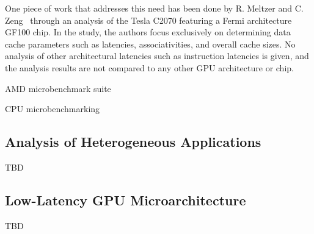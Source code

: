 One piece of work that addresses this need has been done by R. Meltzer and C. Zeng~\cite{meltzer:c2070} through an analysis of the Tesla C2070 featuring a Fermi architecture GF100 chip. In the study, the authors focus exclusively on determining data cache parameters such as latencies, associativities, and overall cache sizes. No analysis of other architectural latencies such as instruction latencies is given, and the analysis results are not compared to any other GPU architecture or chip.

AMD microbenchmark suite

CPU microbenchmarking

\subsection{Analysis of Heterogeneous Applications}

TBD

\subsection{Low-Latency GPU Microarchitecture}

TBD
